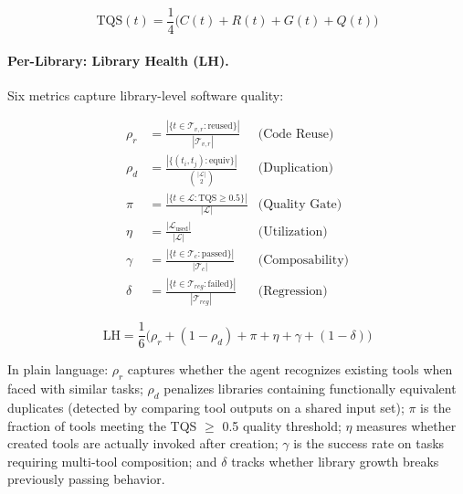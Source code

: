 \documentclass[sigconf,anonymous,review,natbib=false]{acmart}
\begin{document}
\begin{equation}
\text{TQS}(t) = \frac{1}{4}\bigl(C(t) + R(t) + G(t) + Q(t)\bigr)
\end{equation}

\paragraph{Per-Library: Library Health (LH).}
Six metrics capture library-level software quality:

\begin{align}
\rho_r &= \frac{|\{t \in \mathcal{T}_{v,r} : \text{reused}\}|}{|\mathcal{T}_{v,r}|} & \text{(Code Reuse)} \\[2pt]
\rho_d &= \frac{|\{(t_i,t_j) : \text{equiv}\}|}{\binom{|\mathcal{L}|}{2}} & \text{(Duplication)} \\[2pt]
\pi &= \frac{|\{t \in \mathcal{L} : \text{TQS} \geq 0.5\}|}{|\mathcal{L}|} & \text{(Quality Gate)} \\[2pt]
\eta &= \frac{|\mathcal{L}_{\text{used}}|}{|\mathcal{L}|} & \text{(Utilization)} \\[2pt]
\gamma &= \frac{|\{t \in \mathcal{T}_c : \text{passed}\}|}{|\mathcal{T}_c|} & \text{(Composability)} \\[2pt]
\delta &= \frac{|\{t \in \mathcal{T}_{reg} : \text{failed}\}|}{|\mathcal{T}_{reg}|} & \text{(Regression)}
\end{align}

\begin{equation}
\text{LH} = \frac{1}{6}\bigl(\rho_r + (1{-}\rho_d) + \pi + \eta + \gamma + (1{-}\delta)\bigr)
\end{equation}

In plain language: $\rho_r$ captures whether the agent recognizes existing tools when faced with similar tasks; $\rho_d$ penalizes libraries containing functionally equivalent duplicates (detected by comparing tool outputs on a shared input set); $\pi$ is the fraction of tools meeting the TQS $\geq$ 0.5 quality threshold; $\eta$ measures whether created tools are actually invoked after creation; $\gamma$ is the success rate on tasks requiring multi-tool composition; and $\delta$ tracks whether library growth breaks previously passing behavior.
\end{document}
